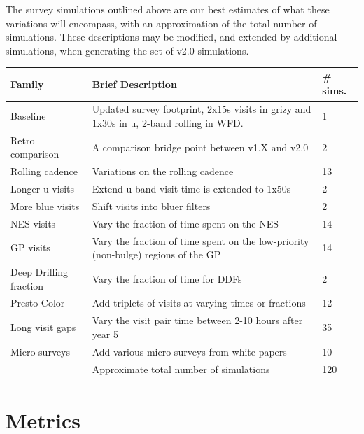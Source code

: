 The survey simulations outlined above are our best estimates of what these variations will encompass, with an approximation of the total number of simulations. These descriptions may be modified, and extended by additional simulations, when generating the set of v2.0 simulations. 
 
 
\vskip 0.4in


\begin{table}[]
\begin{tabular}{l | L | l}
Family               & Brief Description       &    \# sims.   \\
\hline\hline
Baseline            & Updated survey footprint, 2x15s visits in grizy and 1x30s in u, 2-band rolling in WFD. &   1     \\
Retro comparison     & A comparison bridge point between v1.X and v2.0  & 2 \\
Rolling cadence      & Variations on the rolling cadence   & 13  \\
Longer u visits  & Extend  u-band visit time is extended to 1x50s    &    2 \\
More blue visits & Shift visits into bluer filters & 2 \\
NES visits & Vary the fraction of time spent on the NES & 14 \\
GP visits & Vary the fraction of time spent on the low-priority (non-bulge) regions of the GP & 14 \\
Deep Drilling fraction & Vary the fraction of time for DDFs & 2 \\
Presto Color & Add triplets of visits at varying times or fractions  & 12 \\
Long visit gaps & Vary the visit pair time between 2-10 hours after year 5  &  35 \\
Micro surveys & Add various micro-surveys from white papers  & 10 \\
\hline
 & Approximate total number of simulations &  120 \\
\hline
\end{tabular}
\end{table}\label{tab:shortlist}


\section{Metrics}

